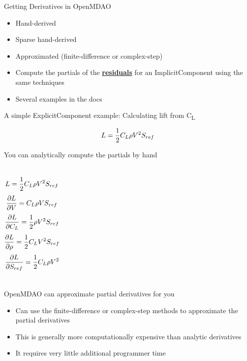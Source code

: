 \documentclass[aspectratio=169, usenames,dvipsnames, 14pt]{beamer}
\begin{document}
\begingroup
{}
\begin{frame}{Getting Derivatives in OpenMDAO}

	\begin{itemize}
		\item Hand-derived
		\item Sparse hand-derived
		\item Approximated (finite-difference or complex-step)
		\item Compute the partials of the \textbf{\underline{residuals}} for an ImplicitComponent using the same techniques
		\item Several examples in the docs
	\end{itemize}

\end{frame}
\endgroup

\begin{frame}{A simple ExplicitComponent example: Calculating lift from C\textsubscript{L}}

		$$ \large L = \dfrac{1}{2} C_L \rho V^2 S_{ref} $$
	
\end{frame}

\begin{frame}{You can analytically compute the partials by hand}

	\begin{columns}
				$$ \large L = \frac{1}{2} C_L \rho V^2 S_{ref} $$
				$$ \small \dfrac{\partial L}{\partial V} = C_L \rho V S_{ref} $$ 
				$$ \small \dfrac{\partial L}{\partial C_L} = \dfrac{1}{2} \rho V^2 S_{ref} $$
				$$ \small \dfrac{\partial L}{\partial \rho} = \dfrac{1}{2} C_L V^2 S_{ref} $$
				$$ \small \dfrac{\partial L}{\partial S_{ref}} = \dfrac{1}{2} C_L \rho V^2 $$
	\end{columns}

\end{frame}

\begin{frame}{OpenMDAO can approximate partial derivatives for you}

	\begin{itemize}
		\item Can use the finite-difference or complex-step methods to approximate the partial derivatives
		\item This is generally more computationally expensive than analytic derivatives
		\item It requires very little additional programmer time
	\end{itemize}

\end{frame}
\end{document}
